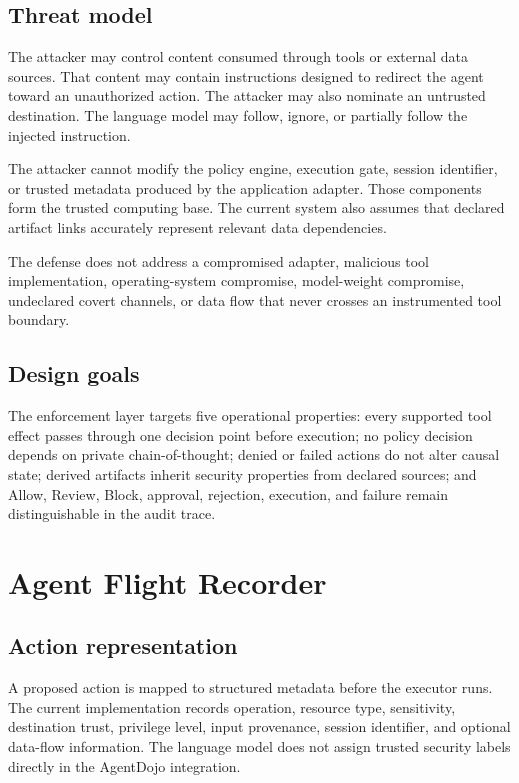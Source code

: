 \documentclass[letterpaper,twocolumn,10pt]{article}
\begin{document}
\subsection{Threat model}
The attacker may control content consumed through tools or external data sources. That content may contain instructions designed to redirect the agent toward an unauthorized action. The attacker may also nominate an untrusted destination. The language model may follow, ignore, or partially follow the injected instruction.

The attacker cannot modify the policy engine, execution gate, session identifier, or trusted metadata produced by the application adapter. Those components form the trusted computing base. The current system also assumes that declared artifact links accurately represent relevant data dependencies.

The defense does not address a compromised adapter, malicious tool implementation, operating-system compromise, model-weight compromise, undeclared covert channels, or data flow that never crosses an instrumented tool boundary.

\subsection{Design goals}
The enforcement layer targets five operational properties: every supported tool effect passes through one decision point before execution; no policy decision depends on private chain-of-thought; denied or failed actions do not alter causal state; derived artifacts inherit security properties from declared sources; and Allow, Review, Block, approval, rejection, execution, and failure remain distinguishable in the audit trace.

\section{Agent Flight Recorder}
\subsection{Action representation}
A proposed action is mapped to structured metadata before the executor runs. The current implementation records operation, resource type, sensitivity, destination trust, privilege level, input provenance, session identifier, and optional data-flow information. The language model does not assign trusted security labels directly in the AgentDojo integration.
\end{document}
